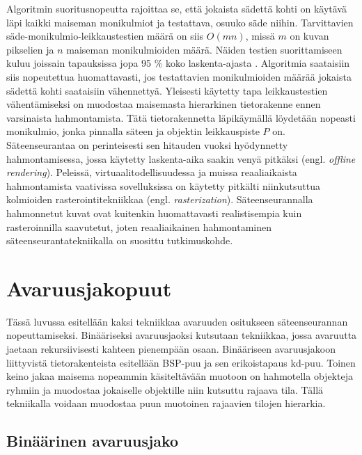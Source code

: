 \documentclass[a4paper, 12pt, titlepage]{article}
\begin{document}
Algoritmin suoritusnopeutta rajoittaa se, että jokaista sädettä kohti on käytävä läpi kaikki maiseman monikulmiot ja testattava, osuuko säde niihin. Tarvittavien säde-monikulmio-leikkaustestien määrä on siis $O(mn)$, missä $m$ on kuvan pikselien ja $n$ maiseman monikulmioiden määrä. Näiden testien suorittamiseen kuluu joissain tapauksissa jopa 95 \% koko laskenta-ajasta \citep{whitted}. Algoritmia saataisiin siis nopeutettua huomattavasti, jos testattavien monikulmioiden määrää jokaista sädettä kohti saataisiin vähennettyä. Yleisesti käytetty tapa leikkaustestien vähentämiseksi on muodostaa maisemasta hierarkinen tietorakenne ennen varsinaista hahmontamista. Tätä tietorakennetta läpikäymällä löydetään nopeasti monikulmio, jonka pinnalla säteen ja objektin leikkauspiste $P$ on. \citep[.]{rubin}\\

Säteenseurantaa on perinteisesti sen hitauden vuoksi hyödynnetty hahmontamisessa, jossa käytetty laskenta-aika saakin venyä pitkäksi (engl. \emph{offline rendering}). Peleissä, virtuaalitodellisuudessa ja muissa reaaliaikaista hahmontamista vaativissa sovelluksissa on käytetty pitkälti niinkutsuttua kolmioiden rasterointitekniikkaa (engl. \emph{rasterization}). Säteenseurannalla hahmonnetut kuvat ovat kuitenkin huomattavasti realistisempia kuin rasteroinnilla saavutetut, joten reaaliaikainen hahmontaminen säteenseurantatekniikalla on suosittu tutkimuskohde. \citep[.]{wald04}  


\vspace{-0.5cm}

\newpage
\section{Avaruusjakopuut}

Tässä luvussa esitellään kaksi tekniikkaa avaruuden ositukseen säteenseurannan nopeuttamiseksi. Binääriseksi avaruusjaoksi kutsutaan tekniikkaa, jossa avaruutta jaetaan rekursiivisesti kahteen pienempään osaan. Binääriseen avaruusjakoon liittyvistä tietorakenteista esitellään BSP-puu ja sen erikoistapaus kd-puu. Toinen keino jakaa maisema nopeammin käsiteltävään muotoon on hahmotella objekteja ryhmiin ja muodostaa jokaiselle objektille niin kutsuttu rajaava tila. Tällä tekniikalla voidaan muodostaa puun muotoinen rajaavien tilojen hierarkia. 

\subsection{Binäärinen avaruusjako}
\end{document}
